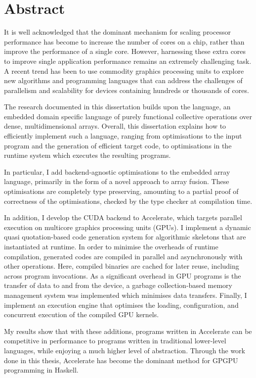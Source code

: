 
\chapter{Abstract}

It is well acknowledged that the dominant mechanism for scaling processor
performance has become to increase the number of cores on a chip, rather than
improve the performance of a single core. However, harnessing these extra cores
to improve single application performance remains an extremely challenging task.
A recent trend has been to use commodity graphics processing units to explore
new algorithms and programming languages that can address the challenges of
parallelism and scalability for devices containing hundreds or thousands of
cores.

The research documented in this dissertation builds upon the 
language, an embedded domain specific language of purely functional collective
operations over dense, multidimensional arrays. Overall, this dissertation
explains how to efficiently implement such a language, ranging from
optimisations to the input program and the generation of efficient target code,
to optimisations in the runtime system which executes the resulting programs.

In particular, I add backend-agnostic optimisations to the embedded array
language, primarily in the form of a novel approach to array fusion. These
optimisations are completely type preserving, amounting to a partial proof of
correctness of the optimisations, checked by the type checker at compilation
time.

In addition, I develop the CUDA\cuda{} backend to Accelerate, which targets
parallel execution on multicore graphics processing units (GPUs)\gpu{}. I
implement a dynamic quasi quotation-based code generation system for algorithmic
skeletons that are instantiated at runtime. In order to minimise the overheads
of runtime compilation, generated codes are compiled in parallel and
asynchronously with other operations. Here, compiled binaries are cached for
later reuse, including across program invocations. As a significant overhead in
GPU programs is the transfer of data to and from the device, a garbage
collection-based memory management system was implemented which minimises data
transfers. Finally, I implement an execution engine that optimises the loading,
configuration, and concurrent execution of the compiled GPU kernels.

My results show that with these additions, programs written in Accelerate can
be competitive in performance to programs written in traditional lower-level
languages, while enjoying a much higher level of abstraction. Through the work
done in this thesis, Accelerate has become the dominant method for GPGPU\gpgpu{}
programming in Haskell.


